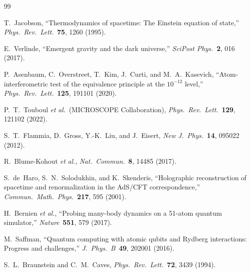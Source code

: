 \documentclass[12pt,letterpaper]{article}
\theoremstyle{plain}
\theoremstyle{definition}
\theoremstyle{remark}
\begin{document}

\begin{thebibliography}{99}

T.~Jacobson,
``Thermodynamics of spacetime: The Einstein equation of state,''
\textit{Phys.\ Rev.\ Lett.}\ \textbf{75}, 1260 (1995).

E.~Verlinde,
``Emergent gravity and the dark universe,''
\textit{SciPost Phys.}\ \textbf{2}, 016 (2017).

P.~Asenbaum, C.~Overstreet, T.~Kim, J.~Curti, and M.~A.~Kasevich,
``Atom-interferometric test of the equivalence principle at the $10^{-12}$ level,''
\textit{Phys.\ Rev.\ Lett.}\ \textbf{125}, 191101 (2020).

P.~T.~Touboul \textit{et al.}\ (MICROSCOPE Collaboration),
\textit{Phys.\ Rev.\ Lett.}\ \textbf{129}, 121102 (2022).

S.~T.~Flammia, D.~Gross, Y.-K.~Liu, and J.~Eisert,
\textit{New J.\ Phys.}\ \textbf{14}, 095022 (2012).

R.~Blume-Kohout \textit{et al.},
\textit{Nat.\ Commun.}\ \textbf{8}, 14485 (2017).

S.~de~Haro, S.~N.~Solodukhin, and K.~Skenderis,
``Holographic reconstruction of spacetime and renormalization in the AdS/CFT correspondence,''
\textit{Commun.\ Math.\ Phys.}\ \textbf{217}, 595 (2001).

H.~Bernien \textit{et al.},
``Probing many-body dynamics on a 51-atom quantum simulator,''
\textit{Nature}\ \textbf{551}, 579 (2017).

M.~Saffman,
``Quantum computing with atomic qubits and Rydberg interactions: Progress and challenges,''
\textit{J.\ Phys.\ B}\ \textbf{49}, 202001 (2016).

S.~L.~Braunstein and C.~M.~Caves,
\textit{Phys.\ Rev.\ Lett.}\ \textbf{72}, 3439 (1994).

\end{thebibliography}
\end{document}
